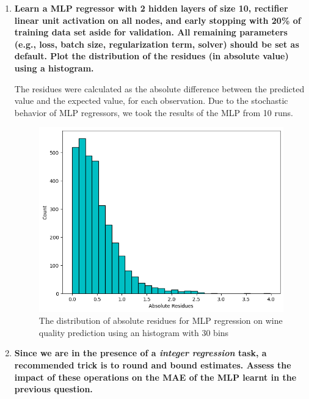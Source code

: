 \documentclass[12pt]{article}
\begin{document}
\begin{enumerate}[leftmargin=\labelsep]
    \item \textbf{Learn a MLP regressor with 2 hidden layers of size 10, rectifier linear unit activation
          on all nodes, and early stopping with 20\% of training data set aside for validation. All
          remaining parameters (e.g., loss, batch size, regularization term, solver) should be set as
          default. Plot the distribution of the residues (in absolute value) using a histogram.}

          \vskip 0.3cm
          

          The residues were calculated as the absolute difference between the predicted value and the expected value, for each observation.
          Due to the stochastic behavior of MLP regressors, we took the results of the MLP from 10 runs.

          \begin{figure}[H]
              \centering
              \includegraphics[width=14cm]{./assets/residues_histogram_ex1_PartII.png}
              \caption{The distribution of absolute residues for MLP regression on wine quality prediction using an histogram with 30 bins}
              \label{fig:PartII-ex1}
          \end{figure}

    \item \textbf{Since we are in the presence of a \textit{integer regression} task, a recommended trick is to
          round and bound estimates. Assess the impact of these operations on the MAE of the MLP learnt in the previous question.}


\end{enumerate}
\end{document}
